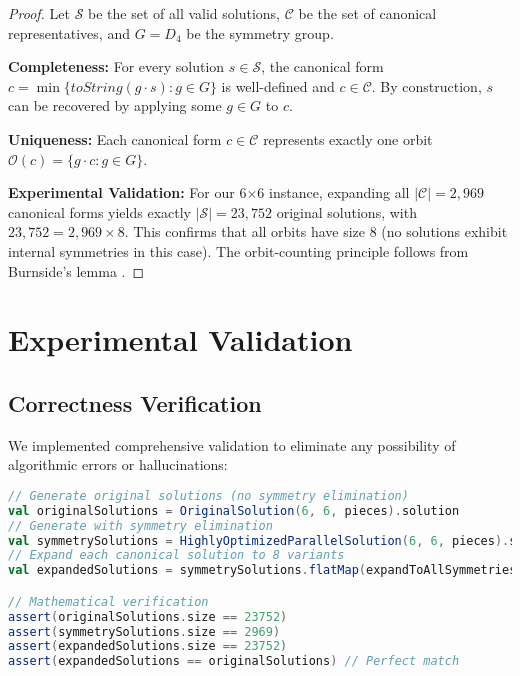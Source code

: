 \documentclass[12pt,a4paper]{article}
\theoremstyle{definition}
\begin{document}
\begin{proof}
Let $\mathcal{S}$ be the set of all valid solutions, $\mathcal{C}$ be the set of canonical representatives, and $G = D_4$ be the symmetry group.

\textbf{Completeness:} For every solution $s \in \mathcal{S}$, the canonical form $c = \min\{toString(g \cdot s) : g \in G\}$ is well-defined and $c \in \mathcal{C}$. By construction, $s$ can be recovered by applying some $g \in G$ to $c$.

\textbf{Uniqueness:} Each canonical form $c \in \mathcal{C}$ represents exactly one orbit $\mathcal{O}(c) = \{g \cdot c : g \in G\}$.

\textbf{Experimental Validation:} For our 6$\times$6 instance, expanding all $|\mathcal{C}| = 2,969$ canonical forms yields exactly $|\mathcal{S}| = 23,752$ original solutions, with $23,752 = 2,969 \times 8$. This confirms that all orbits have size 8 (no solutions exhibit internal symmetries in this case). The orbit-counting principle follows from Burnside's lemma \cite{brualdi2010}.
\end{proof}

\section{Experimental Validation}

\subsection{Correctness Verification}

We implemented comprehensive validation to eliminate any possibility of algorithmic errors or hallucinations:

\begin{lstlisting}[language=Scala, caption=Symmetry Verification Test]
// Generate original solutions (no symmetry elimination)
val originalSolutions = OriginalSolution(6, 6, pieces).solution
// Generate with symmetry elimination  
val symmetrySolutions = HighlyOptimizedParallelSolution(6, 6, pieces).solution
// Expand each canonical solution to 8 variants
val expandedSolutions = symmetrySolutions.flatMap(expandToAllSymmetries)

// Mathematical verification
assert(originalSolutions.size == 23752)
assert(symmetrySolutions.size == 2969) 
assert(expandedSolutions.size == 23752)
assert(expandedSolutions == originalSolutions) // Perfect match
\end{lstlisting}
\end{document}
